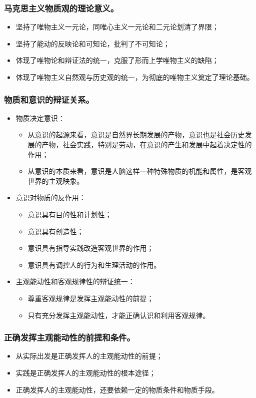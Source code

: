 \documentclass{article}
\begin{document}
\subsubsection{马克思主义物质观的理论意义。}
\begin{itemize}
    \item 坚持了唯物主义一元论，同唯心主义一元论和二元论划清了界限；
    \item 坚持了能动的反映论和可知论，批判了不可知论；
    \item 体现了唯物论和辩证法的统一，克服了形而上学唯物主义的缺陷；
    \item 体现了唯物主义自然观与历史观的统一，为彻底的唯物主义奠定了理论基础。
\end{itemize}

\subsubsection{物质和意识的辩证关系。}
\begin{itemize}
    \item 物质决定意识：
    \begin{itemize}
        \item 从意识的起源来看，意识是自然界长期发展的产物，意识也是社会历史发展的产物，社会实践，特别是劳动，在意识的产生和发展中起着决定性的作用；
        \item 从意识的本质来看，意识是人脑这样一种特殊物质的机能和属性，是客观世界的主观映象。
    \end{itemize}
    \item 意识对物质的反作用：
    \begin{itemize}
        \item 意识具有目的性和计划性；
        \item 意识具有创造性；
        \item 意识具有指导实践改造客观世界的作用；
        \item 意识具有调控人的行为和生理活动的作用。
    \end{itemize}
    \item 主观能动性和客观规律性的辩证统一：
    \begin{itemize}
        \item 尊重客观规律是发挥主观能动性的前提；
        \item 只有充分发挥主观能动性，才能正确认识和利用客观规律。
    \end{itemize}
\end{itemize}

\subsubsection{正确发挥主观能动性的前提和条件。}
\begin{itemize}
    \item 从实际出发是正确发挥人的主观能动性的前提；
    \item 实践是正确发挥人的主观能动性的根本途径；
    \item 正确发挥人的主观能动性，还要依赖一定的物质条件和物质手段。
\end{itemize}
\end{document}
